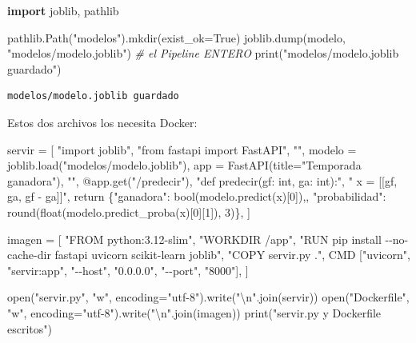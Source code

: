 \documentclass[
]{article}
\newenvironment{Shaded}{}{}
\newcommand{\BuiltInTok}[1]{\textcolor[rgb]{0.00,0.50,0.00}{#1}}
\newcommand{\CharTok}[1]{\textcolor[rgb]{0.25,0.44,0.63}{#1}}
\newcommand{\CommentTok}[1]{\textcolor[rgb]{0.38,0.63,0.69}{\textit{#1}}}
\newcommand{\ImportTok}[1]{\textcolor[rgb]{0.00,0.50,0.00}{\textbf{#1}}}
\newcommand{\NormalTok}[1]{#1}
\newcommand{\OperatorTok}[1]{\textcolor[rgb]{0.40,0.40,0.40}{#1}}
\newcommand{\StringTok}[1]{\textcolor[rgb]{0.25,0.44,0.63}{#1}}
\newcommand{\VariableTok}[1]{\textcolor[rgb]{0.10,0.09,0.49}{#1}}
\begin{document}
\protect{}\label{uiPdQu81nYyY}
\begin{Shaded}
\begin{Highlighting}[]
\ImportTok{import}\NormalTok{ joblib, pathlib}

\NormalTok{pathlib.Path(}\StringTok{"modelos"}\NormalTok{).mkdir(exist\_ok}\OperatorTok{=}\VariableTok{True}\NormalTok{)}
\NormalTok{joblib.dump(modelo, }\StringTok{"modelos/modelo.joblib"}\NormalTok{)     }\CommentTok{\# el Pipeline ENTERO}
\BuiltInTok{print}\NormalTok{(}\StringTok{"modelos/modelo.joblib guardado"}\NormalTok{)}
\end{Highlighting}
\end{Shaded}

\begin{verbatim}
modelos/modelo.joblib guardado
\end{verbatim}

\protect{}\label{RpkclTf8nYyZ}
Estos dos archivos los necesita Docker:

\protect{}\label{41Bv3xLbnYyZ}
\begin{Shaded}
\begin{Highlighting}[]
\NormalTok{servir }\OperatorTok{=}\NormalTok{ [}
    \StringTok{"import joblib"}\NormalTok{,}
    \StringTok{"from fastapi import FastAPI"}\NormalTok{,}
    \StringTok{""}\NormalTok{,}
    \StringTok{\textquotesingle{}modelo = joblib.load("modelos/modelo.joblib")\textquotesingle{}}\NormalTok{,}
    \StringTok{\textquotesingle{}app = FastAPI(title="Temporada ganadora")\textquotesingle{}}\NormalTok{,}
    \StringTok{""}\NormalTok{,}
    \StringTok{\textquotesingle{}@app.get("/predecir")\textquotesingle{}}\NormalTok{,}
    \StringTok{"def predecir(gf: int, ga: int):"}\NormalTok{,}
    \StringTok{"    x = [[gf, ga, gf {-} ga]]"}\NormalTok{,}
    \StringTok{\textquotesingle{}    return \{"ganadora": bool(modelo.predict(x)[0]),\textquotesingle{}}\NormalTok{,}
    \StringTok{\textquotesingle{}            "probabilidad": round(float(modelo.predict\_proba(x)[0][1]), 3)\}\textquotesingle{}}\NormalTok{,}
\NormalTok{]}

\NormalTok{imagen }\OperatorTok{=}\NormalTok{ [}
    \StringTok{"FROM python:3.12{-}slim"}\NormalTok{,}
    \StringTok{"WORKDIR /app"}\NormalTok{,}
    \StringTok{"RUN pip install {-}{-}no{-}cache{-}dir fastapi uvicorn scikit{-}learn joblib"}\NormalTok{,}
    \StringTok{"COPY servir.py ."}\NormalTok{,}
    \StringTok{\textquotesingle{}CMD ["uvicorn", "servir:app", "{-}{-}host", "0.0.0.0", "{-}{-}port", "8000"]\textquotesingle{}}\NormalTok{,}
\NormalTok{]}

\BuiltInTok{open}\NormalTok{(}\StringTok{"servir.py"}\NormalTok{, }\StringTok{"w"}\NormalTok{, encoding}\OperatorTok{=}\StringTok{"utf{-}8"}\NormalTok{).write(}\StringTok{"}\CharTok{\textbackslash{}n}\StringTok{"}\NormalTok{.join(servir))}
\BuiltInTok{open}\NormalTok{(}\StringTok{"Dockerfile"}\NormalTok{, }\StringTok{"w"}\NormalTok{, encoding}\OperatorTok{=}\StringTok{"utf{-}8"}\NormalTok{).write(}\StringTok{"}\CharTok{\textbackslash{}n}\StringTok{"}\NormalTok{.join(imagen))}
\BuiltInTok{print}\NormalTok{(}\StringTok{"servir.py y Dockerfile escritos"}\NormalTok{)}
\end{Highlighting}
\end{Shaded}
\end{document}
